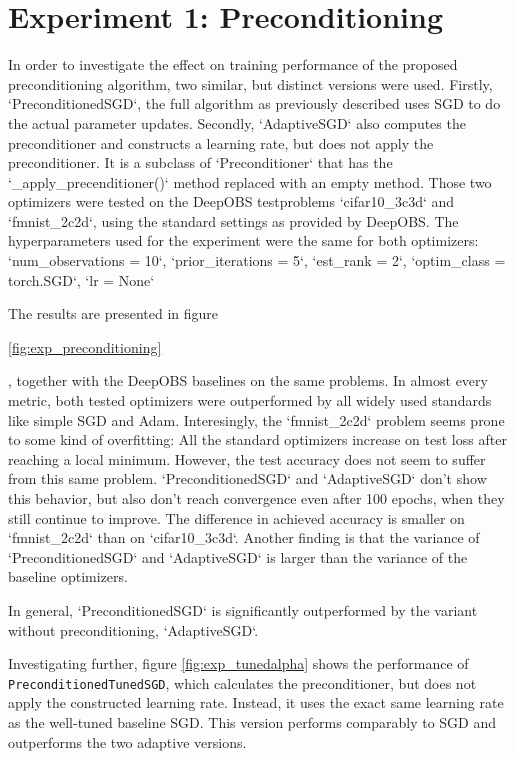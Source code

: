 \documentclass[twoside,12pt,a4paper]{report}
\begin{document}
\section{Experiment 1: Preconditioning}
\begin{markdown}
In order to investigate the effect on training performance of the proposed preconditioning algorithm, two similar, but distinct versions were used. Firstly, `PreconditionedSGD`, the full algorithm as previously described uses SGD to do the actual parameter updates. Secondly, `AdaptiveSGD` also computes the preconditioner and constructs a learning rate, but does not apply the preconditioner. It is a subclass of `Preconditioner` that has the `_apply_precenditioner()` method replaced with an empty method. Those two optimizers were tested on the DeepOBS testproblems `cifar10_3c3d` and `fmnist_2c2d`, using the standard settings as provided by DeepOBS.
The hyperparameters used for the experiment were the same for both optimizers: `num_observations = 10`, `prior_iterations = 5`, `est_rank = 2`, `optim_class = torch.SGD`, `lr = None`

The results are presented in figure \end{markdown}
\ref{fig:exp_preconditioning}
\begin{markdown}, together with the DeepOBS baselines on the same problems. In almost every metric, both tested optimizers were outperformed by all widely used standards like simple SGD and Adam. Interesingly, the `fmnist_2c2d` problem seems prone to some kind of overfitting: All the standard optimizers increase on test loss after reaching a local minimum. However, the test accuracy does not seem to suffer from this same problem. `PreconditionedSGD` and `AdaptiveSGD` don't show this behavior, but also don't reach convergence even after 100 epochs, when they still continue to improve. The difference in achieved accuracy is smaller on `fmnist_2c2d` than on `cifar10_3c3d`.
Another finding is that the variance of `PreconditionedSGD` and `AdaptiveSGD` is larger than the variance of the baseline optimizers.

In general, `PreconditionedSGD` is significantly outperformed by the variant without preconditioning, `AdaptiveSGD`.
\end{markdown}

Investigating further, figure \ref{fig:exp_tunedalpha} shows the performance of \verb|PreconditionedTunedSGD|, which calculates the preconditioner, but does not apply the constructed learning rate. Instead, it uses the exact same learning rate as the well-tuned baseline SGD. This version performs comparably to SGD and outperforms the two adaptive versions.
\end{document}

